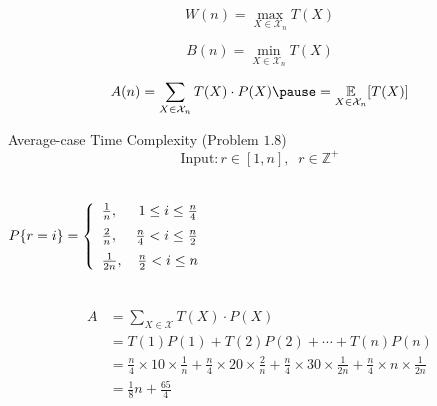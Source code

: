 
\begin{frame}{}
\end{frame}

\begin{frame}{}
  \begin{center}
    {\large {}} \\[8pt] \pause
    {\large {}}
  \end{center}

  \pause
  \[
    W(n) = \max_{X \in \mathcal{X}_{n}} T(X)
  \]

  \pause
  \[
    B(n) = \min_{X \in \mathcal{X}_{n}} T(X)
  \]

  \pause
  \[
    A(n) = \sum_{X \in \mathcal{X}_{n}} T(X) \cdot P(X) \pause = \underset{X \in \mathcal{X}_{n}}{\mathbb{E}} [T(X)]
  \]
\end{frame}

\begin{frame}{}
  \begin{exampleblock}{Average-case Time Complexity (Problem $1.8$)}
    \[
      \text{Input}: r \in [1,n], \;\; r \in \mathbb{Z}^{+}
    \]

    \begin{columns}
	\[
	  P\{r = i\} = \left\{\begin{array}{lr}
	    \frac{1}{n}, & 1 \le i \le \frac{n}{4} \\[6pt]
	    \frac{2}{n}, & \frac{n}{4} < i \le \frac{n}{2} \\[6pt]
	    \frac{1}{2n}, & \frac{n}{2} < i \le n
	  \end{array}\right.
	\]
    \end{columns}
  \end{exampleblock}

  \pause
  \begin{align*}
    A &= \sum_{X \in \mathcal{X}} T(X) \cdot P(X) \\
      &= T(1) P(1) + T(2) P(2) + \cdots + T(n) P(n) \\
      &= \frac{n}{4} \times 10 \times \frac{1}{n} + \frac{n}{4} \times 20 \times \frac{2}{n} + 
         \frac{n}{4} \times 30 \times \frac{1}{2n} + \frac{n}{4} \times n \times \frac{1}{2n} \\
      &= \frac{1}{8} n + \frac{65}{4}
  \end{align*}
\end{frame}

